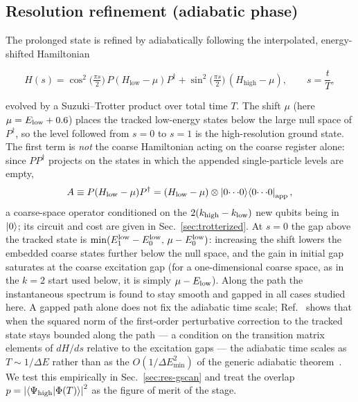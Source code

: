 \documentclass[
  aps,            %
  prc,            %
  reprint,        %
  superscriptaddress,
  floatfix,
  nofootinbib
]{revtex4-2}
\newcommand{\Hlow}{H_{\mathrm{low}}}
\newcommand{\Hhigh}{H_{\mathrm{high}}}
\begin{document}
\subsection{Resolution refinement (adiabatic phase)}
\label{sec:refine}
The prolonged state is refined by adiabatically following the interpolated,
energy-shifted Hamiltonian
\begin{widetext}
\begin{equation}
  H(s)=\cos^2\!\Big(\tfrac{\pi s}{2}\Big)\,P(\Hlow-\mu)P^\dagger
      +\sin^2\!\Big(\tfrac{\pi s}{2}\Big)\,(\Hhigh-\mu),
  \qquad s=\frac{t}{T},
  \label{eq:path}
\end{equation}
\end{widetext}
evolved by a Suzuki--Trotter product over total time $T$.  The shift $\mu$
(here $\mu=E_{\rm low}+0.6$) places the tracked low-energy states below the large
null space of $P^\dagger$, so the level followed from $s=0$ to $s=1$ is the
high-resolution ground state.  The first term is \emph{not} the coarse
Hamiltonian acting on the coarse register alone: since $PP^\dagger$ projects on
the states in which the appended single-particle levels are empty,
\begin{equation}
  A\equiv P(\Hlow-\mu)P^\dagger=(\Hlow-\mu)\otimes
  \ket{0\!\cdots\!0}\!\bra{0\!\cdots\!0}_{\rm app},
  \label{eq:Aterm}
\end{equation}
a coarse-space operator conditioned on the $2(k_{\rm high}-k_{\rm low})$ new
qubits being in $\ket{0}$; its circuit and cost are given in
Sec.~\ref{sec:trotterized}.  At $s=0$ the gap above the tracked state is
$\min(E_1^{\rm low}-E_0^{\rm low},\,\mu-E_0^{\rm low})$: increasing the shift
lowers the embedded coarse states further below the null space, and the gain
in initial gap saturates at the coarse excitation gap (for a one-dimensional
coarse space, as in the $k=2$ start used below, it is simply $\mu-E_{\rm low}$).
Along the path the instantaneous spectrum is found to stay smooth and gapped
in all cases studied here.  A gapped path alone does not fix the adiabatic
time scale; Ref.~\cite{Bogner2026} shows that when the squared norm of the
first-order perturbative correction to the tracked state stays bounded along
the path --- a condition on the transition matrix elements of $dH/ds$ relative
to the excitation gaps --- the adiabatic time scales as $T\sim1/\Delta E$
rather than as the $O(1/\Delta E_{\min}^2)$ of the generic adiabatic
theorem~\cite{Albash2018}.  We test this empirically in
Sec.~\ref{sec:res-gscan} and treat the overlap
$p=\abs{\braket{\Psi_{\rm high}}{\Phi(T)}}^2$ as the figure of merit of the
stage.
\end{document}
